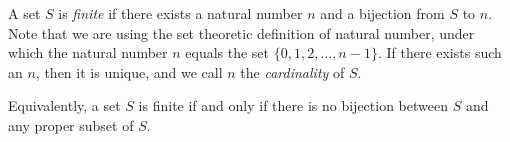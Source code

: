 \documentclass[12pt]{article}
\begin{document}
A set $S$ is \emph{finite} if there exists a natural number $n$ and a bijection from $S$ to $n$. Note that we are using the set theoretic definition of natural number, under which the natural number $n$ equals the set $\{0,1,2,\ldots,n-1\}$.  If there exists such an $n$, then it is unique, and we call $n$ the \emph{cardinality} of $S$.

Equivalently, a set $S$ is finite if and only if there is no bijection between $S$ and any proper subset of $S$.

\end{document}

